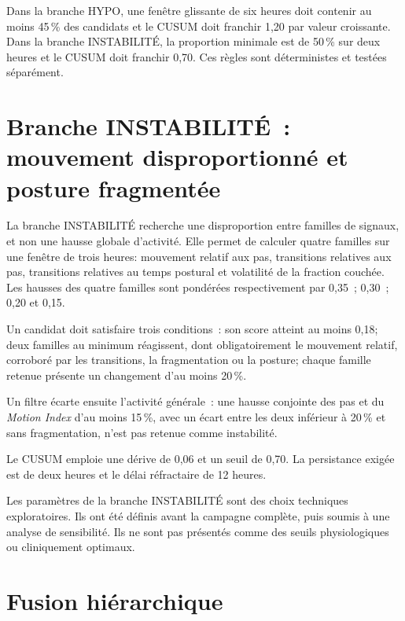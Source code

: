 Dans la branche HYPO, une fenêtre glissante de six heures doit contenir au moins 45\,\% des
candidats et le CUSUM doit franchir 1,20 par valeur croissante. Dans la branche INSTABILITÉ, la proportion minimale
est de 50\,\% sur deux heures et le CUSUM doit franchir 0,70. Ces règles sont déterministes et
testées séparément.

\section{Branche INSTABILITÉ~: mouvement disproportionné et posture fragmentée}
\label{sec:instabilite}
La branche INSTABILITÉ recherche une disproportion entre familles de signaux, et non une
hausse globale d'activité. Elle permet de calculer quatre
familles sur une fenêtre de trois heures: mouvement relatif aux pas, transitions relatives
aux pas, transitions relatives au temps postural et volatilité de la fraction couchée. Les
hausses des quatre familles sont pondérées respectivement par 0,35~; 0,30~; 0,20 et 0,15.

Un candidat doit satisfaire trois conditions~: son score atteint au moins 0,18; deux familles
au minimum réagissent, dont obligatoirement le mouvement relatif, corroboré par les
transitions, la fragmentation ou la posture; chaque famille retenue présente un changement
d'au moins 20\,\%.

Un filtre écarte ensuite l'activité générale~: une hausse conjointe des pas et du
\textit{Motion Index} d'au moins 15\,\%, avec un écart entre les deux inférieur à 20\,\% et
sans fragmentation, n'est pas retenue comme instabilité.

Le CUSUM emploie une dérive de 0,06 et un seuil de 0,70. La persistance exigée est de deux
heures et le délai réfractaire de 12 heures.

Les paramètres de la branche INSTABILITÉ sont des choix techniques exploratoires. Ils ont
été définis avant la campagne complète, puis soumis à une analyse de sensibilité. Ils ne sont
pas présentés comme des seuils physiologiques ou cliniquement optimaux.

\section{Fusion hiérarchique}
